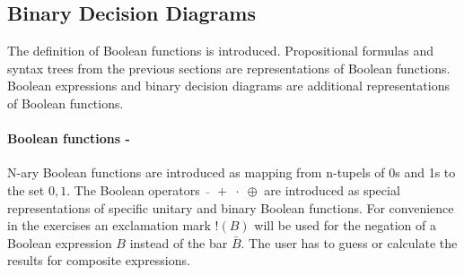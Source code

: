 %
%
%
%
%

\subsection{Binary Decision Diagrams}

The definition of Boolean functions is introduced. 
Propositional formulas and syntax trees from the previous sections are representations of Boolean functions.
Boolean expressions and binary decision diagrams are additional representations of Boolean functions.

\paragraph{Boolean functions - }
\label{tut:51}
N-ary Boolean functions are introduced as mapping from n-tupels of 0s and 1s to the set ${0,1}$.
The Boolean operators $\bar{ \;\;}\;+\;\cdot\;\oplus$ are introduced as special representations of
specific unitary and binary Boolean functions. 
For convenience  in the exercises
an exclamation mark $!(B)$ 
will be used for the negation of a Boolean expression $B$ instead of the bar $\bar{B}$. 
The user has to guess or calculate the results for composite expressions.

